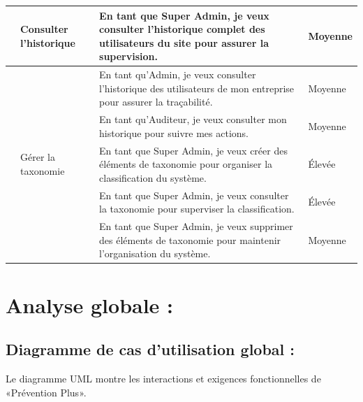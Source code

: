 \begin{longtable}{|>{\raggedright\arraybackslash}p{0.5cm}|>{\raggedright\arraybackslash}p{3cm}|>{\raggedright\arraybackslash}p{8cm}|>{\raggedright\arraybackslash}p{2cm}|}
\hline
17 & Consulter l'historique & En tant que Super Admin, je veux consulter l'historique complet des utilisateurs du site pour assurer la supervision. & Moyenne \\
\cline{3-4}
& & En tant qu'Admin, je veux consulter l'historique des utilisateurs de mon entreprise pour assurer la traçabilité. & Moyenne \\
\cline{3-4}
& & En tant qu'Auditeur, je veux consulter mon historique pour suivre mes actions. & Moyenne \\
\hline
18 & Gérer la taxonomie & En tant que Super Admin, je veux créer des éléments de taxonomie pour organiser la classification du système. & Élevée \\
\cline{3-4}
& & En tant que Super Admin, je veux consulter la taxonomie pour superviser la classification. & Élevée \\
\cline{3-4}
& & En tant que Super Admin, je veux supprimer des éléments de taxonomie pour maintenir l'organisation du système. & Moyenne \\
\hline
\end{longtable}

\section{Analyse globale :}

\subsection{Diagramme de cas d'utilisation global :}

\noindent Le diagramme UML montre les interactions et exigences fonctionnelles de «Prévention Plus».

